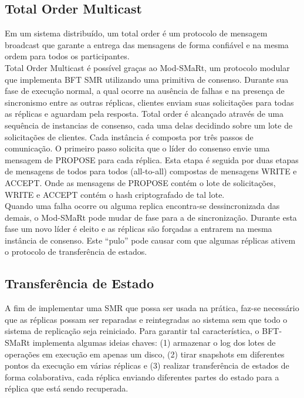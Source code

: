 		\subsection{Total Order Multicast}
		Em um sistema distribuído, um total order é um protocolo de mensagem broadcast que garante a entrega das mensagens de forma confiável e na mesma ordem para todos os participantes.\\
		
		Total Order Multicast é possível graças ao Mod-SMaRt, um protocolo modular que implementa BFT SMR utilizando uma primitiva de consenso. Durante sua fase de execução normal, a qual ocorre na ausência de falhas e na presença de sincronismo entre as outras réplicas, clientes enviam suas solicitações para todas as réplicas e aguardam pela resposta. Total order é alcançado através de uma sequência de instancias de consenso, cada uma delas decidindo sobre um lote de solicitações de clientes. Cada instância é composta por três passos de comunicação. O primeiro passo solicita que o líder do consenso envie uma mensagem de PROPOSE para cada réplica. Esta etapa é seguida por duas etapas de mensagens de todos para todos (all-to-all) compostas de mensagens WRITE e ACCEPT. Onde as mensagens de PROPOSE contém o lote de solicitações, WRITE e ACCEPT contém o hash criptografado de tal lote.\\
		
		Quando uma falha ocorre ou alguma replica encontra-se dessincronizada das demais, o Mod-SMaRt pode mudar de fase para a de sincronização. Durante esta fase um novo líder é eleito e as réplicas são forçadas a entrarem na mesma instância de consenso. Este “pulo” pode causar com que algumas réplicas ativem o protocolo de transferência de estados.\\
		
		\subsection{Transferência de Estado}
		A fim de implementar uma SMR que possa ser usada na prática, faz-se necessário que as réplicas possam ser reparadas e reintegradas ao sistema sem que todo o sistema de replicação seja reiniciado. Para garantir tal característica, o BFT-SMaRt implementa algumas ideias chaves: (1) armazenar o log dos lotes de operações em execução em apenas um disco, (2) tirar snapshots em diferentes pontos da execução em várias réplicas e (3) realizar transferência de estados  de forma colaborativa, cada réplica enviando diferentes partes do estado para a réplica que está sendo recuperada.\\
	
